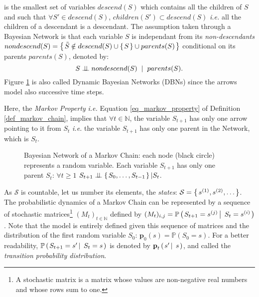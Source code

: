 is the smallest set of variables $descend(S)$
which contains all the children of $S$ 
and such that $\forall S' \in descend(S)$, $children(S') \subset descend(S)$ 
\textit{i.e.} all the children of a descendant is a descendant.
The assumption taken through a Bayesian Network is that each variable $S$ 
is independant from its \textit{non-descendants} 
$nondescend(S) = \left\{ \left. \tilde{S} \notin descend(S) \cup \left\{ \left.  S  \right. \right\} \cup parents(S)  \right. \right\}$
conditional on its parents $parents(S)$,
denoted by: 
\[ S \perp\!\!\!\perp nondescend(S) \hspace{0.2cm} \vert \hspace{0.2cm} parents(S). \]
Figure \ref{fig_markov_chain} is also called Dynamic Bayesian Networks (DBNs) 
\cite{Dean:1989:DBN} since the arrows model also successive time steps. 


Here, the \textit{Markov Property} \textit{i.e.} 
Equation \ref{eq_markov_property} of Definition \ref{def_markov_chain},
implies that $\forall t \in \mathbb{N}$,
the variable $S_{t+1}$
has only one arrow pointing to it
from $S_t$
\textit{i.e.} 
the variable $S_{t+1}$ has only one parent
in the Network, which is $S_{t}$.
\begin{figure}

\caption[Bayesian Network of a Markov Chain]{Bayesian Network of a Markov Chain:
each node (black circle) represents a random variable. 
Each variable $S_{t+1}$ has only one parent $S_t$: $\forall t\geqslant1$
$S_{t+1} \perp\!\!\!\perp \left\{ \left.  S_{0}, \ldots, S_{t-1}  \right. \right\} \vert S_t$.}
\label{fig_markov_chain}
\end{figure}

As $\mathcal{S}$ is countable, 
let us number its elements, the \textit{states}: 
$\mathcal{S}=\left\{ \left.  s^{(1)},s^{(2)}, \ldots \right. \right\}$. 
The probabilistic dynamics of a Markov Chain 
can be represented by 
a sequence of stochastic matrices\footnote{A stochastic matrix
is a matrix whose values are non-negative real numbers and whose rows sum to one.} 
$(M_{t})_{t \in \mathbb{N}}$ 
defined by $ (M_t)_{i,j} = \mathbb{P} \left( \left.  S_{t+1}=s^{(j)} \, \right| \left. \, S_{t} = s^{(i)} \right. \right)$.
Note that the model is entirely defined 
given this sequence of matrices 
and the distribution of the first random variable $S_0$:
$\textbf{p}_0(s) = \mathbb{P}(S_0=s)$.
For a better readability, $\mathbb{P} \left( \left.  S_{t+1}=s' \, \right| \left. \, S_{t} = s \right. \right)$ 
is denoted by $\textbf{p}_t \left( \left. s' \, \right| \left. \, s \right. \right)$,
and called the 	\textit{transition probability distribution}.


